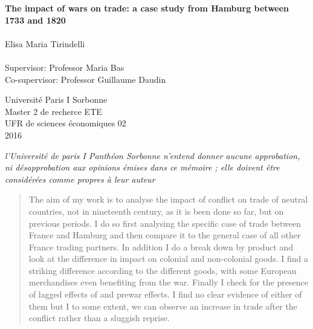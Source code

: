\documentclass[12pt,a4paper,titlepage]{article}
\begin{document}
\begin{titlepage}
\begin{center}
\vspace*{1cm}
 
      \vspace{0.5cm}
		\Large     
         \textbf{The impact of wars on trade: a case study from Hamburg between 1733 and 1820}\\~\\
        \vspace{2cm}
        {Elisa Maria Tirindelli}\\~\\
        {Supervisor: Professor Maria Bas}\\
        {Co-supervisor: Professor Guillaume Daudin}
        
        \vfill
        
        Université Paris I Sorbonne\\
        Master 2 de recherce ETE \\
        UFR de sciences économiques 02\\
        2016
        
\end{center}
\end{titlepage}
\begin{center}
\vspace*{\fill}
 \textit{l'Université de paris I Panthéon Sorbonne n'entend donner aucune approbation,
ni désapprobation aux opinions émises dans ce mémoire ; elle doivent être considérées comme propres à leur auteur}
\vspace{\fill}
\end{center}
\newpage

\begin{abstract}
The aim of my work is to analyse the impact of conflict on trade of neutral countries, not in nineteenth century, as it is been done so far, but on previous periods. I do so first analysing the specific case of trade between France and Hamburg and then compare it to the general case of all other France trading partners. In addition I do a break down by product and look at the difference in impact on colonial and non-colonial goods. I find a striking difference according to the different goods, with some European merchandises even benefiting from the war. Finally I check for the presence of lagged effects of and prewar effects. I find no clear evidence of either of them but I to some extent, we can observe an increase in trade after the conflict rather than a sluggish reprise. 
\end{abstract}
\end{document}
